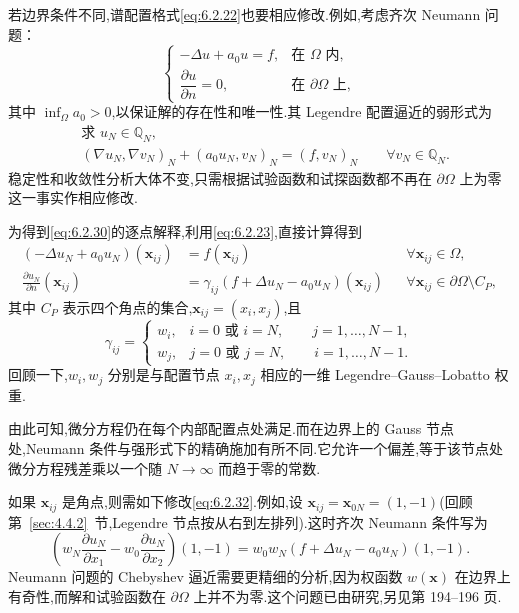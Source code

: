若边界条件不同,谱配置格式\eqref{eq:6.2.22}也要相应修改.例如,考虑齐次 Neumann 问题：
\begin{equation}\label{eq:6.2.29}
  \begin{cases}
    -\Delta u+a_0u=f,&\text{在 }\Omega\text{ 内},\\
    \dfrac{\partial u}{\partial n}=0,&\text{在 }\partial\Omega\text{ 上},
  \end{cases}
\end{equation}
其中 \(\inf_\Omega a_0>0\),以保证解的存在性和唯一性.其 Legendre 配置逼近的弱形式为
\begin{equation}\label{eq:6.2.30}
  \begin{aligned}
    &\text{求 }u_N\in\mathbb Q_N,\\
    &(\nabla u_N,\nabla v_N)_N+(a_0u_N,v_N)_N=(f,v_N)_N
      \qquad\forall v_N\in\mathbb Q_N.
  \end{aligned}
\end{equation}
稳定性和收敛性分析大体不变,只需根据试验函数和试探函数都不再在 \(\partial\Omega\) 上为零这一事实作相应修改.

为得到\eqref{eq:6.2.30}的逐点解释,利用\eqref{eq:6.2.23},直接计算得到
\begin{align}
  (-\Delta u_N+a_0u_N)(\boldsymbol{x}_{ij})
      &=f(\boldsymbol{x}_{ij})&&\forall\boldsymbol{x}_{ij}\in\Omega,\label{eq:6.2.31}\\
  \frac{\partial u_N}{\partial n}(\boldsymbol{x}_{ij})
      &=\gamma_{ij}(f+\Delta u_N-a_0u_N)(\boldsymbol{x}_{ij})
       &&\forall\boldsymbol{x}_{ij}\in\partial\Omega\setminus C_P,\label{eq:6.2.32}
\end{align}
其中 \(C_P\) 表示四个角点的集合,\(\boldsymbol{x}_{ij}=(x_i,x_j)\),且
\[
  \gamma_{ij}=
  \begin{cases}
    w_i,&i=0\text{ 或 }i=N,\qquad j=1,\ldots,N-1,\\
    w_j,&j=0\text{ 或 }j=N,\qquad i=1,\ldots,N-1.
  \end{cases}
\]
回顾一下,\(w_i,w_j\) 分别是与配置节点 \(x_i,x_j\) 相应的一维 Legendre--Gauss--Lobatto 权重.

由此可知,微分方程仍在每个内部配置点处满足.而在边界上的 Gauss 节点处,Neumann 条件与强形式下的精确施加有所不同.它允许一个偏差,等于该节点处微分方程残差乘以一个随 \(N\to\infty\) 而趋于零的常数.

如果 \(\boldsymbol{x}_{ij}\) 是角点,则需如下修改\eqref{eq:6.2.32}.例如,设 \(\boldsymbol{x}_{ij}=\boldsymbol{x}_{0N}=(1,-1)\)(回顾第~\ref{sec:4.4.2}~节,Legendre 节点按从右到左排列).这时齐次 Neumann 条件写为
\begin{equation}\label{eq:6.2.33}
  \left(w_N\frac{\partial u_N}{\partial x_1}
         -w_0\frac{\partial u_N}{\partial x_2}\right)(1,-1)
    =w_0w_N(f+\Delta u_N-a_0u_N)(1,-1).
\end{equation}
Neumann 问题的 Chebyshev 逼近需要更精细的分析,因为权函数 \(w(\boldsymbol{x})\) 在边界上有奇性,而解和试验函数在 \(\partial\Omega\) 上并不为零.这个问题已由研究,另见第 194–196 页.

